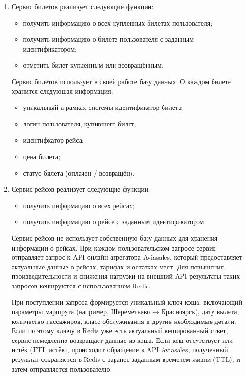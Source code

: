 \begin{enumerate}
    \item Сервис билетов реализует следующие функции:
    \begin{itemize}
        \item получить информацию о всех купленных билетах пользователя; 
        \item получить информацию о билете пользователя с заданным идентификатором; 
        \item отметить билет купленным или возвращённым.
    \end{itemize}

     Сервис билетов использует в своей работе базу данных. О каждом билете хранится следующая информация:
    \begin{itemize}
        \item уникальный а рамках системы идентификатор билета;
        \item логин пользователя, купившего билет;
        \item идентифкатор рейса;
        \item цена билета;
        \item статус билета (оплачен / возвращён).
    \end{itemize}
    
    \item Сервис рейсов реализует следующие функции:
    \begin{itemize}
        \item получить информацию о всех рейсах; 
        \item получить информацию о рейсе с заданным идентификатором.
    \end{itemize}

    Сервис рейсов не использует собственную базу данных для хранения информации о рейсах. 
    При каждом пользовательском запросе сервис отправляет запрос к API онлайн-агрегатора Aviasales, который предоставляет актуальные данные о рейсах, тарифах и остатках мест. 
    Для повышения производительности и снижения нагрузки на внешний API результаты таких запросов кешируются с использованием Redis.

    При поступлении запроса формируется уникальный ключ кэша, включающий параметры маршрута (например, Шереметьево → Красноярск), дату вылета, количество пассажиров, класс обслуживания и другие необходимые детали. 
    Если по этому ключу в Redis уже есть актуальный кешированный ответ, сервис немедленно возвращает данные из кэша. 
    Если кеш отсутствует или истёк (TTL истёк), происходит обращение к API Aviasales, полученный результат сохраняется в Redis с заранее заданным временем жизни (TTL), и затем отправляется пользователю.


\end{enumerate}
